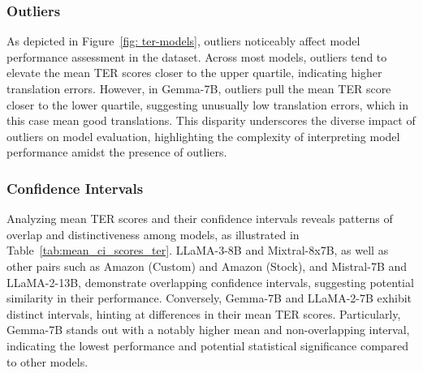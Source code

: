 \subsubsection{Outliers}

As depicted in Figure~\ref{fig: ter-models}, outliers noticeably affect model performance assessment in the dataset. Across most models, outliers tend to elevate the mean TER scores closer to the upper quartile, indicating higher translation errors. However, in Gemma-7B, outliers pull the mean TER score closer to the lower quartile, suggesting unusually low translation errors, which in this case mean good translations. This disparity underscores the diverse impact of outliers on model evaluation, highlighting the complexity of interpreting model performance amidst the presence of outliers.


\subsubsection{Confidence Intervals}

Analyzing mean TER scores and their confidence intervals reveals patterns of overlap and distinctiveness among models, as illustrated in Table~\ref{tab:mean_ci_scores_ter}. LLaMA-3-8B and Mixtral-8x7B, as well as other pairs such as Amazon (Custom) and Amazon (Stock), and Mistral-7B and LLaMA-2-13B, demonstrate overlapping confidence intervals, suggesting potential similarity in their performance. Conversely, Gemma-7B and LLaMA-2-7B exhibit distinct intervals, hinting at differences in their mean TER scores. Particularly, Gemma-7B stands out with a notably higher mean and non-overlapping interval, indicating the lowest performance and potential statistical significance compared to other models.


